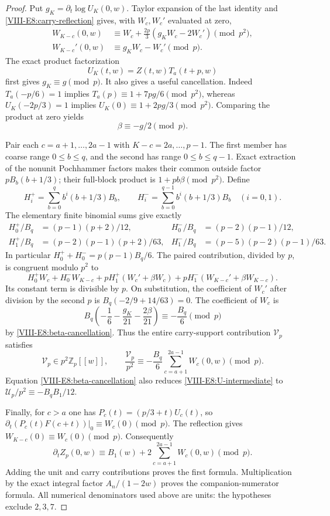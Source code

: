 \documentclass[11pt,letterpaper]{article}
\numberwithin{equation}{section}
\begin{document}
\begin{proof}
Put $g_K=\partial_t\log U_K(0,w)$. Taylor expansion of the last
identity and \eqref{VIII-E8:carry-reflection} gives, with $W_c,W_c'$
evaluated at zero,
\begin{align*}
 W_{K-c}(0,w)&\equiv W_c+\frac{2p}{3}(g_KW_c-2W_c')\pmod{p^2},\\
 W_{K-c}'(0,w)&\equiv g_KW_c-W_c'\pmod p.
\end{align*}
The exact product factorization
\[
 U_K(t,w)=Z(t,w)T_a(t+p,w)
\]
first gives $g_K\equiv g\pmod p$. It also gives a useful cancellation.
Indeed $T_a(-p/6)=1$ implies
$T_a(p)\equiv1+7pg/6\pmod{p^2}$, whereas
$U_K(-2p/3)=1$ implies
$U_K(0)\equiv1+2pg/3\pmod{p^2}$. Comparing the product at zero yields
\begin{equation}\label{VIII-E8:beta-cancellation}
 \boxed{\beta\equiv-g/2\pmod p.}
\end{equation}

Pair each $c=a+1,\ldots,2a-1$ with $K-c=2a,\ldots,p-1$.
The first member has coarse range $0\le b\le q$, and the second
has range $0\le b\le q-1$. Exact extraction of the nonunit
Pochhammer factors makes their common outside factor
$pB_b(b+1/3)$; their full-block product is
$1+pb\beta\pmod{p^2}$. Define
\[
 H_i^+=\sum_{b=0}^q b^i(b+1/3)B_b,\qquad
 H_i^-=\sum_{b=0}^{q-1} b^i(b+1/3)B_b\quad(i=0,1).
\]
The elementary finite binomial sums give exactly
\begin{align*}
 H_0^+/B_q&=(p-1)(p+2)/12,&
 H_0^-/B_q&=(p-2)(p-1)/12,\\
 H_1^+/B_q&=(p-2)(p-1)(p+2)/63,&
 H_1^-/B_q&=(p-5)(p-2)(p-1)/63.
\end{align*}
In particular $H_0^++H_0^-=p(p-1)B_q/6$.
The paired contribution, divided by $p$, is congruent modulo $p^2$ to
\[
 H_0^+W_c+H_0^-W_{K-c}
 +pH_1^+(W_c'+\beta W_c)
 +pH_1^-(W_{K-c}'+\beta W_{K-c}).
\]
Its constant term is divisible by $p$. On substitution, the
coefficient of $W_c'$ after division by the second $p$ is
$B_q(-2/9+14/63)=0$. The coefficient of $W_c$ is
\[
 B_q\left(-\frac16-\frac{g_K}{21}-\frac{2\beta}{21}\right)
 \equiv-\frac{B_q}{6}\pmod p
\]
by \eqref{VIII-E8:beta-cancellation}. Thus the entire carry-support
contribution $\mathcal V_p$ satisfies
\[
 \mathcal V_p\in p^2\mathbb Z_p[[w]],\qquad
 \frac{\mathcal V_p}{p^2}
 \equiv-\frac{B_q}{6}\sum_{c=a+1}^{2a-1}W_c(0,w)\pmod p.
\]
Equation \eqref{VIII-E8:beta-cancellation} also reduces
\eqref{VIII-E8:U-intermediate} to $\mathcal U_p/p^2\equiv-B_qB_1/12$.

Finally, for $c>a$ one has
$P_c(t)=(p/3+t)U_c(t)$, so
$\partial_t(P_c(t)F(c+t))|_0\equiv W_c(0)\pmod p$.
The reflection gives $W_{K-c}(0)\equiv W_c(0)\pmod p$.
Consequently
\[
 \partial_t Z_p(0,w)
 \equiv B_1(w)+2\sum_{c=a+1}^{2a-1}W_c(0,w)\pmod p.
\]
Adding the unit and carry contributions proves the first formula.
Multiplication by the exact integral factor $A_n/(1-2w)$ proves
the companion-numerator formula. All numerical denominators used
above are units: the hypotheses exclude $2,3,7$.
\end{proof}
\end{document}

